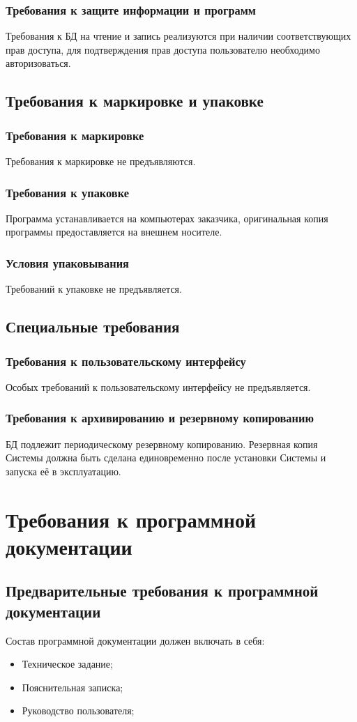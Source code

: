     \subsubsection{Требования к защите информации и программ}
      Требования к БД на чтение и запись реализуются при наличии соответствующих прав доступа, для подтверждения прав доступа пользователю необходимо авторизоваться.
  \subsection{Требования к маркировке и упаковке}
    \subsubsection{Требования к маркировке}
      Требования к маркировке не предъявляются.
    \subsubsection{Требования к упаковке}
      Программа устанавливается на компьютерах заказчика, оригинальная копия программы предоставляется на внешнем носителе.
    \subsubsection{Условия упаковывания}
      Требований к упаковке не предъявляется.
  \subsection{Специальные требования}
    \subsubsection{Требования к пользовательскому интерфейсу}
      Особых требований к пользовательскому интерфейсу не предъявляется.
    \subsubsection{Требования к архивированию и резервному копированию}
      БД подлежит периодическому резервному копированию. Резервная копия Системы должна быть сделана единовременно после установки Системы и запуска её в эксплуатацию.
\section{Требования к программной документации}
  \subsection{Предварительные требования к программной документации}
    Состав программной документации должен включать в себя:
    \begin{itemize}
    \item Техническое задание;
    \item Пояснительная записка;
    \item Руководство пользователя;
    \end{itemize}
